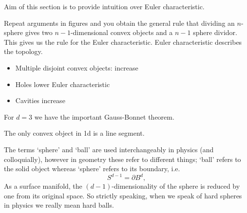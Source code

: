 Aim of this section is to provide intuition over Euler characteristic.

Repeat arguments in figures and you obtain the general rule that dividing an $n$-sphere gives two $n-1$-dimensional convex objects and a $n-1$ sphere dividor.
This gives us the rule for the Euler characteristic.
Euler characteristic describes the topology.

\begin{itemize}
\item Multiple disjoint convex objects: increase
\item Holes lower Euler characteristic
\item Cavities increase
\end{itemize}

For $d=3$ we have the important Gauss-Bonnet theorem.

The only convex object in 1d is a line segment.



\begin{tcolorbox}[title=Aside: nomenclature of spheres vs balls]
  The terms `sphere' and `ball' are used interchangeably in physics (and colloquially), however in geometry these refer to different things; `ball' refers to the solid object whereas `sphere' refers to its boundary, i.e.\
  \begin{equation*}
    S^{d-1} = \partial B^d,
  \end{equation*}
  As a surface manifold, the $(d-1)$-dimensionality of the sphere is reduced by one from its original space.
  So strictly speaking, when we speak of hard spheres in physics we really mean hard balls.
\end{tcolorbox}

